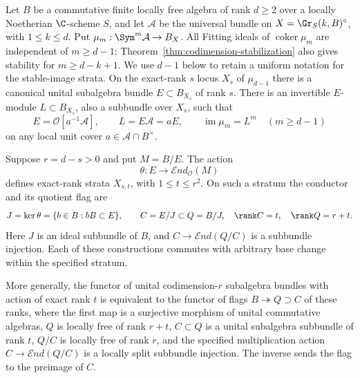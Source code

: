 \begin{theorem}
\label{thm:higher-defect-strata}
Let $B$ be a commutative finite locally free algebra of rank $d\ge2$
over a locally Noetherian $\C$-scheme $S$, and let $\mathcal A$ be the
universal bundle on $X=\Gr_S(k,B)^\circ$, with $1\le k\le d$.
Put $\mu_m:\Sym^m\mathcal A\to B_X$.
All Fitting ideals of $\operatorname{coker}\mu_m$ are independent of
$m\ge d-1$; Theorem~\ref{thm:codimension-stabilization} also gives
stability for $m\ge d-k+1$. We use $d-1$ below to retain a
uniform notation for the stable-image strata. On the exact-rank $s$ locus $X_s$ of $\mu_{d-1}$ there
is a canonical unital subalgebra bundle $E\subset B_{X_s}$ of rank $s$.
There is an invertible $E$-module $L\subset B_{X_s}$, also a subbundle
over $X_s$, such that
\begin{equation}\label{eq:stable-image-bundle}
 E=\mathcal O[a^{-1}\mathcal A],\qquad L=E\mathcal A=aE,
 \qquad \operatorname{im}\mu_m=L^m\quad(m\ge d-1)
\end{equation}
on any local unit cover $a\in\mathcal A\cap B^\times$.

Suppose $r=d-s>0$ and put $M=B/E$. The action
\[
 \theta:E\longrightarrow\mathcal E nd_{\mathcal O}(M)
\]
defines exact-rank strata $X_{s,t}$, with $1\le t\le r^2$.
On such a stratum the conductor and its quotient flag are
\begin{equation}\label{eq:conductor-flag}
 J=\ker\theta=\{b\in B:bB\subset E\},\qquad
 C=E/J\subset Q=B/J,
 \quad \rank C=t,\quad\rank Q=r+t.
\end{equation}
Here $J$ is an ideal subbundle of $B$, and $C\to\mathcal E nd(Q/C)$
is a subbundle injection. Each of these constructions commutes with
arbitrary base change within the specified stratum.

More generally, the functor of unital codimension-$r$ subalgebra
bundles with action of exact rank $t$ is equivalent to the functor of
flags $B\twoheadrightarrow Q\supset C$ of these ranks, where the
first map is a surjective morphism of unital commutative algebras,
$Q$ is locally free of rank $r+t$, $C\subset Q$ is a unital
subalgebra subbundle of rank $t$, $Q/C$ is locally free of rank $r$,
and the specified multiplication action
$C\to\mathcal E nd(Q/C)$ is a locally split subbundle injection. The inverse sends the flag to the
preimage of $C$.
\end{theorem}
